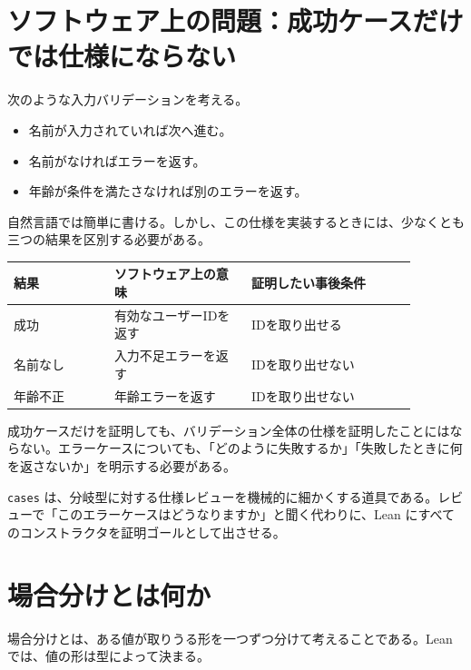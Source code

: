
\section{ソフトウェア上の問題：成功ケースだけでは仕様にならない}

次のような入力バリデーションを考える。

\begin{itemize}
\item 名前が入力されていれば次へ進む。
\item 名前がなければエラーを返す。
\item 年齢が条件を満たさなければ別のエラーを返す。
\end{itemize}

自然言語では簡単に書ける。しかし、この仕様を実装するときには、少なくとも三つの結果を区別する必要がある。

\begin{center}
\begin{tabular}{p{0.22\linewidth}p{0.30\linewidth}p{0.36\linewidth}}
\toprule
結果 & ソフトウェア上の意味 & 証明したい事後条件 \\
\midrule
成功 & 有効なユーザーIDを返す & IDを取り出せる \\
名前なし & 入力不足エラーを返す & IDを取り出せない \\
年齢不正 & 年齢エラーを返す & IDを取り出せない \\
\bottomrule
\end{tabular}
\end{center}

成功ケースだけを証明しても、バリデーション全体の仕様を証明したことにはならない。エラーケースについても、「どのように失敗するか」「失敗したときに何を返さないか」を明示する必要がある。

\begin{softwarebox}
\texttt{cases} は、分岐型に対する仕様レビューを機械的に細かくする道具である。レビューで「このエラーケースはどうなりますか」と聞く代わりに、Lean にすべてのコンストラクタを証明ゴールとして出させる。
\end{softwarebox}

\section{場合分けとは何か}

場合分けとは、ある値が取りうる形を一つずつ分けて考えることである。Lean では、値の形は型によって決まる。

